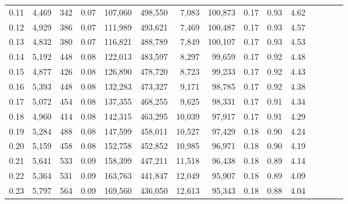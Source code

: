 \begin{tabular}{rrrcrrrrrrrrrrr}
0.11 &   4,469 &     342 &                                       0.07 &  107,060 &  498,550 &    7,083 &  100,873 &  0.17 &  0.93 &                         4.62 \\
0.12 &   4,929 &     386 &                                       0.07 &  111,989 &  493,621 &    7,469 &  100,487 &  0.17 &  0.93 &                         4.57 \\
0.13 &   4,832 &     380 &                                       0.07 &  116,821 &  488,789 &    7,849 &  100,107 &  0.17 &  0.93 &                         4.53 \\
0.14 &   5,192 &     448 &                                       0.08 &  122,013 &  483,597 &    8,297 &   99,659 &  0.17 &  0.92 &                         4.48 \\
0.15 &   4,877 &     426 &                                       0.08 &  126,890 &  478,720 &    8,723 &   99,233 &  0.17 &  0.92 &                         4.43 \\
0.16 &   5,393 &     448 &                                       0.08 &  132,283 &  473,327 &    9,171 &   98,785 &  0.17 &  0.92 &                         4.38 \\
0.17 &   5,072 &     454 &                                       0.08 &  137,355 &  468,255 &    9,625 &   98,331 &  0.17 &  0.91 &                         4.34 \\
0.18 &   4,960 &     414 &                                       0.08 &  142,315 &  463,295 &   10,039 &   97,917 &  0.17 &  0.91 &                         4.29 \\
0.19 &   5,284 &     488 &                                       0.08 &  147,599 &  458,011 &   10,527 &   97,429 &  0.18 &  0.90 &                         4.24 \\
0.20 &   5,159 &     458 &                                       0.08 &  152,758 &  452,852 &   10,985 &   96,971 &  0.18 &  0.90 &                         4.19 \\
0.21 &   5,641 &     533 &                                       0.09 &  158,399 &  447,211 &   11,518 &   96,438 &  0.18 &  0.89 &                         4.14 \\
0.22 &   5,364 &     531 &                                       0.09 &  163,763 &  441,847 &   12,049 &   95,907 &  0.18 &  0.89 &                         4.09 \\
0.23 &   5,797 &     564 &                                       0.09 &  169,560 &  436,050 &   12,613 &   95,343 &  0.18 &  0.88 &                         4.04 \\

\end{tabular}
